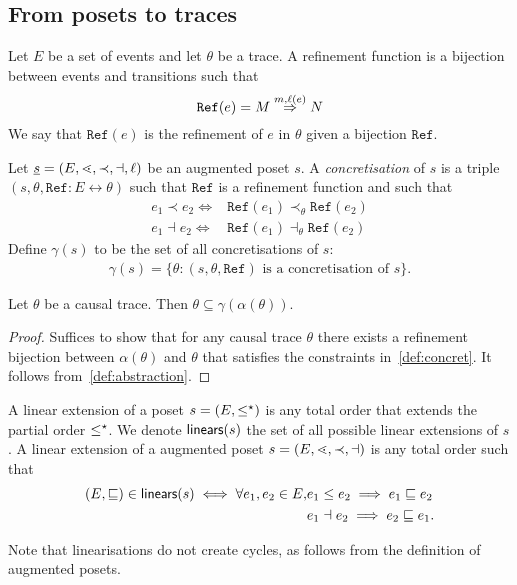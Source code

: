 \subsection{From posets to traces}
\label{sec:refinement}

\begin{definition}
  Let $E$ be a set of events and let $\theta$ be a trace. A refinement function is a bijection between events and transitions such that
  \[
  \mathtt{Ref}(e) = M\overset{m,\ell(e)}{\Rightarrow}N
  \]
  We say that $\mathtt{Ref}(e)$ is the refinement of $e$ in $\theta$ given a bijection $\mathtt{Ref}$.
\end{definition}

\begin{definition}
  \label{def:concret}
  Let $\underline s=(E,\lessdot,\prec,\dashv,\ell)$ be an augmented poset $s$.
  A \emph{concretisation} of $s$ is a triple $(s,\theta,\mathtt{Ref}:E\leftrightarrow\theta)$ such that $\mathtt{Ref}$ is a refinement function and such that
  \begin{align*}
    e_1\prec e_2 \iff& \mathtt{Ref}(e_1) \prec_{\theta}\mathtt{Ref}(e_2)\\
    e_1\dashv e_2 \iff& \mathtt{Ref}(e_1) \dashv_{\theta}\mathtt{Ref}(e_2)
  \end{align*}
  Define $\gamma(s)$ to be the set of all concretisations of $s$:
  \begin{align*}
    \gamma(s) = \{\theta: (s,\theta,\mathtt{Ref})\text{ is a concretisation of }s\}.
  \end{align*}
\end{definition}

\begin{theorem}
  Let $\theta$ be a causal trace. Then $\theta\subseteq\gamma(\alpha(\theta))$.
\end{theorem}
\begin{proof}
  Suffices to show that for any causal trace $\theta$ there exists a refinement bijection between $\alpha(\theta)$ and $\theta$ that satisfies the constraints in~\autoref{def:concret}. It follows from~\autoref{def:abstraction}.
\end{proof}


\begin{definition}
  \label{def:linears}
  A linear extension of a poset $s=(E,\leq^{\star})$ is any total order that extends the partial order $\leq^{\star}$. We denote $\mathsf{linears}(s)$ the set of all possible linear extensions of $s$. A linear extension of a augmented poset $s=(E,\lessdot,\prec,\dashv)$ is any total order such that
  \begin{align*}
    (E,\sqsubseteq)\in\mathsf{linears}(s) \iff \forall e_1,e_2\in E, &e_1\leq e_2\implies e_1\sqsubseteq e_2\\
    & e_1\dashv e_2\implies e_2\sqsubseteq e_1.
  \end{align*}
\end{definition}
Note that linearisations do not create cycles, as follows from the definition of augmented posets.

